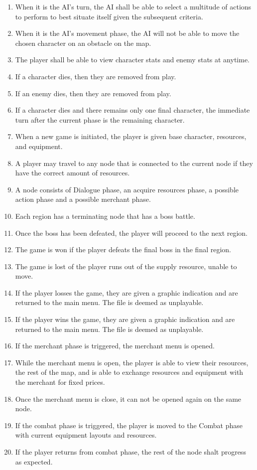 \documentclass{article}
\begin{document}
\begin{enumerate}[{PGR}1. ]
	\item When it is the AI's turn, the AI shall be able to select a multitude of actions to perform to best situate itself given the  subsequent criteria.
	\item When it is the AI's movement phase, the AI will not be able to move the chosen character on an obstacle on the map.
	\item The player shall be able to view character stats and enemy stats at anytime.
	\item If a character dies, then they are removed from play.
	\item If an enemy dies, then they are removed from play.
	\item If a character dies and there remains only one final character, the immediate turn after the current phase is the remaining character.
	\item When a new game is initiated, the player is given base character, resources, and equipment.
	\item A player may travel to any node that is connected to the current node if they have the correct amount of resources.
	\item A node consists of Dialogue phase, an acquire resources phase, a possible action phase and a possible merchant phase.
	\item Each region has a terminating node that has a boss battle.
	\item Once the boss has been defeated, the player will proceed to the next region.
	\item The game is won if the player defeats the final boss in the final region.
	\item The game is lost of the player runs out of the supply resource, unable to move.
	\item If the player losses the game, they are given a graphic indication and are returned to the main menu. The file is deemed as unplayable.
	\item If the player wins the game, they are given a graphic indication and are returned to the main menu. The file is deemed as unplayable.
	\item If the merchant phase is triggered, the merchant menu is opened.
	\item While the merchant menu is open, the player is able to view their resources, the rest of the map, and is able to exchange resources and equipment with the merchant for fixed prices.
	\item Once the merchant menu is close, it can not be opened again on the same node.
	\item If the combat phase is triggered, the player is moved to the Combat phase with current equipment layouts and resources.
	\item If the player returns from combat phase, the rest of the node shalt progress as expected.
\end{enumerate}
\end{document}
